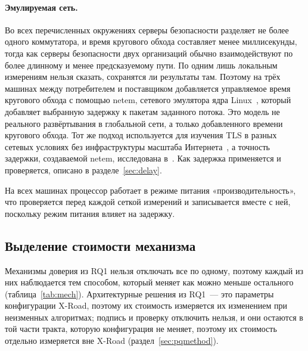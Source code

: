 \documentclass[conference,a4paper]{IEEEtran}
\newcommand{\newtext}[1]{{\color{blue}#1}}
\begin{document}
\paragraph{Эмулируемая сеть.} Во всех перечисленных окружениях серверы безопасности разделяет не более
одного коммутатора, и время кругового обхода составляет менее миллисекунды, тогда как серверы безопасности двух
организаций обычно взаимодействуют по более длинному и менее предсказуемому пути. По одним лишь локальным
измерениям нельзя сказать, сохранятся ли результаты там. Поэтому на трёх машинах между
потребителем и поставщиком добавляется управляемое время кругового обхода с помощью netem,
сетевого эмулятора ядра Linux~\cite{hemminger2005}, который добавляет выбранную задержку к пакетам
заданного потока. Это модель не реального развёртывания в глобальной сети, а только добавленного времени кругового обхода. Тот же подход используется для изучения TLS в разных сетевых условиях без
инфраструктуры масштаба Интернета~\cite{paquin2020}, а точность задержки, создаваемой netem,
исследована в~\cite{nussbaum2009,jurgelionis2011}. Как задержка применяется и проверяется,
описано в разделе~\ref{sec:delay}.

На всех машинах процессор работает в режиме питания «производительность», что проверяется перед каждой сеткой измерений и
записывается вместе с ней, поскольку режим питания влияет на задержку.

\subsection{Выделение стоимости механизма}\label{sec:iso}

Механизмы доверия из RQ1 нельзя отключать все по одному, поэтому каждый из них наблюдается
тем способом, который меняет как можно меньше остального (таблица~\ref{tab:mech}). \newtext{Архитектурные
решения из RQ1~--- это параметры конфигурации X-Road, поэтому их стоимость измеряется их изменением
при неизменных алгоритмах; подпись и проверку отключить нельзя, и они остаются в той
части тракта, которую конфигурация не меняет\newtext{, поэтому их стоимость отдельно измеряется вне
X-Road (раздел~\ref{sec:pqmethod})}.}
\end{document}
